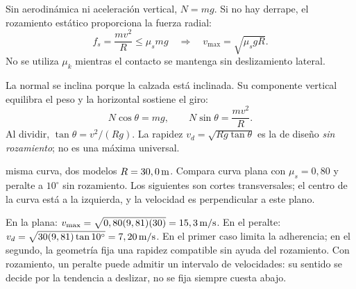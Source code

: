 \documentclass[11pt,a4paper]{article}
\begin{document}
Sin aerodin\'amica ni aceleraci\'on vertical, $N=mg$. Si no hay derrape,
el rozamiento est\'atico proporciona la fuerza radial:
\[
f_s=\frac{mv^2}{R}\le\mu_smg
\quad\Rightarrow\quad v_{\max}=\sqrt{\mu_sgR}.
\]
No se utiliza $\mu_k$ mientras el contacto se mantenga sin deslizamiento lateral.

La normal se inclina porque la calzada est\'a inclinada. Su componente vertical
equilibra el peso y la horizontal sostiene el giro:
\[
N\cos\theta=mg,\qquad N\sin\theta=\frac{mv^2}{R}.
\]
Al dividir, $\tan\theta=v^2/(Rg)$.
La rapidez $v_d=\sqrt{Rg\tan\theta}$ es la de dise\~no \emph{sin rozamiento};
no es una m\'axima universal.

\begin{examplebox}{misma curva, dos modelos}
 $R=30,0\,\mathrm{m}$. Compara curva plana con $\mu_s=0,80$
y peralte a $10^\circ$ sin rozamiento.
\solutionblock
{} Los siguientes son cortes transversales; el centro de la curva
est\'a a la izquierda, y la velocidad es perpendicular a este plano.
\begin{center}
\end{center}
 En la plana:
$v_{\max}=\sqrt{0,80(9,81)(30)}=15,3\,\mathrm{m/s}$.
En el peralte:
$v_d=\sqrt{30(9,81)\tan10^\circ}=7,20\,\mathrm{m/s}$.
 En el primer caso limita la adherencia; en el segundo,
la geometr\'ia fija una rapidez compatible sin ayuda del rozamiento.
Con rozamiento, un peralte puede admitir un intervalo de velocidades:
su sentido se decide por la tendencia a deslizar, no se fija siempre cuesta abajo.
\end{examplebox}
\end{document}
